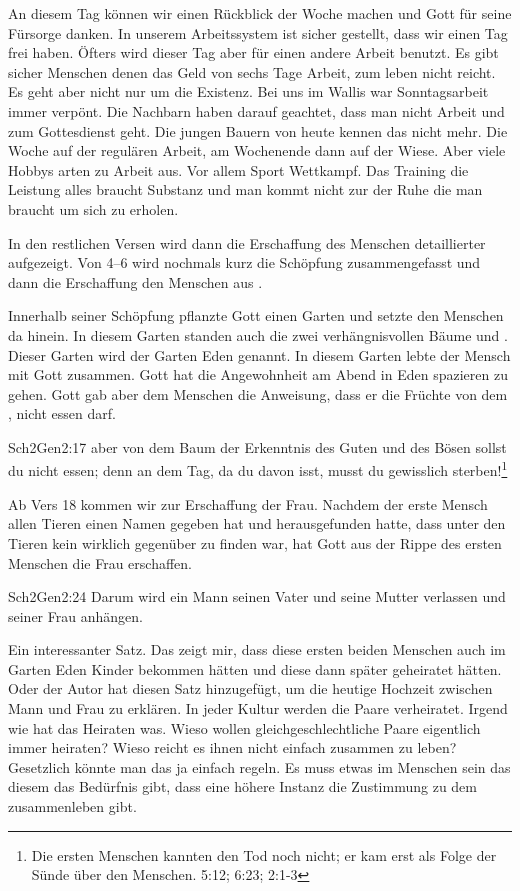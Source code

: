 An diesem Tag können wir einen Rückblick der Woche machen und Gott für seine Fürsorge danken. In unserem Arbeitssystem ist sicher gestellt, dass wir einen Tag frei haben. Öfters wird dieser Tag aber für einen andere Arbeit benutzt. Es gibt sicher Menschen denen das Geld von sechs Tage Arbeit, zum leben nicht reicht. Es geht aber nicht nur um die Existenz. Bei uns im Wallis war Sonntagsarbeit immer verpönt. Die Nachbarn haben darauf geachtet, dass man nicht Arbeit und zum Gottesdienst geht. Die jungen Bauern von heute kennen das nicht mehr. Die Woche auf der regulären Arbeit, am Wochenende dann auf der Wiese. Aber viele Hobbys arten zu Arbeit aus. Vor allem Sport Wettkampf. Das Training die Leistung alles braucht Substanz und man kommt nicht zur der Ruhe die man braucht um sich zu erholen.

In den restlichen Versen wird dann die Erschaffung des Menschen detaillierter aufgezeigt. Von 4--6 wird nochmals kurz die Schöpfung zusammengefasst und dann die Erschaffung den Menschen aus .

Innerhalb seiner Schöpfung pflanzte Gott einen Garten und setzte den Menschen da hinein. In diesem Garten standen auch die zwei verhängnisvollen Bäume  und . Dieser Garten wird der Garten Eden genannt. In diesem Garten lebte der Mensch mit Gott zusammen. Gott hat die Angewohnheit am Abend in Eden spazieren zu gehen. Gott gab aber dem Menschen die Anweisung, dass er die Früchte von dem , nicht essen darf.
\begin{bibeltext}{Sch2}{Gen}{2:17}
	aber von dem Baum der Erkenntnis des Guten und des Bösen sollst du nicht essen; denn an dem Tag, da du davon isst, musst du gewisslich sterben!\footnote{Die ersten Menschen kannten den Tod noch nicht; er kam erst als Folge der Sünde über den Menschen.  {5:12};  {6:23};  {2:1-3}}
\end{bibeltext}

Ab Vers 18 kommen wir zur Erschaffung der Frau. Nachdem der erste Mensch allen Tieren einen Namen gegeben hat und herausgefunden hatte, dass unter den Tieren kein wirklich gegenüber zu finden war, hat Gott aus der Rippe des ersten Menschen die Frau erschaffen.
\begin{bibeltext}{Sch2}{Gen}{2:24}
	Darum wird ein Mann seinen Vater und seine Mutter verlassen und seiner Frau anhängen.
\end{bibeltext}
Ein interessanter Satz. Das zeigt mir, dass diese ersten beiden Menschen auch im Garten Eden Kinder bekommen hätten und diese dann später geheiratet hätten. Oder der Autor hat diesen Satz hinzugefügt, um die heutige Hochzeit zwischen Mann und Frau zu erklären. In jeder Kultur werden die Paare verheiratet. Irgend wie hat das Heiraten was. Wieso wollen gleichgeschlechtliche Paare eigentlich immer heiraten? Wieso reicht es ihnen nicht einfach zusammen zu leben? Gesetzlich könnte man das ja einfach regeln. Es muss etwas im Menschen sein das diesem das Bedürfnis gibt, dass eine höhere Instanz die Zustimmung zu dem zusammenleben gibt.

